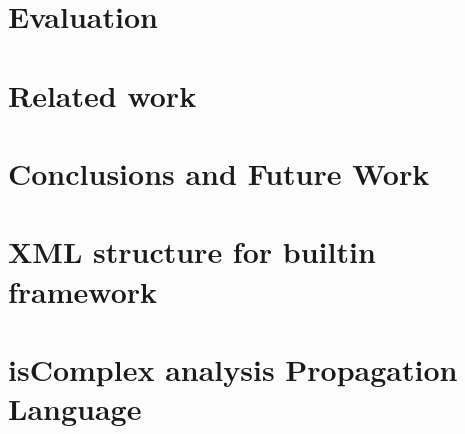 \documentclass[MSc,twoside,openright]{Thesis}
\newcommand{\matlab}{{\sc Matlab}\xspace}
\begin{document}
%


%

\chapter{Evaluation} \label{chap:Evaluation}


\chapter{Related work} \label{chap:Related}


\chapter{Conclusions and Future Work} \label{chap:Conclusions}


\appendix %


\chapter{XML structure for builtin framework} \label{chap:Builtinxml}



%

\chapter{isComplex analysis Propagation Language} \label{chap:Iscomplexprop}

\end{document}

